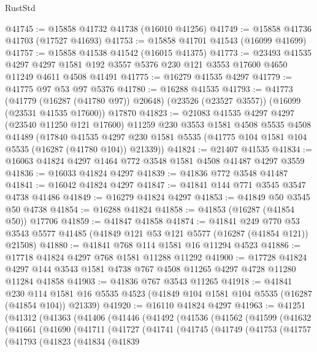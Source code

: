 \begin{lexlean}{RustStd}
\begin{coremodule}
@41745 := @15858 @41732 @41738 (@16010 @41256)
@41749 := @15858 @41736 @41703 (@17527 @41693)
@41753 := @15858 @41701 @41543 (@16099 @41699)
@41757 := @15858 @41538 @41542 (@16015 @41375)
@41773 := @23493
    @41535
    @4297
    @4297
    @1581
    @192
    @3557
    @5376
    @230
    @121
    @3553
    @17600
    @4650
    @11249
    @4611
    @4508
    @41491
@41775 := @16279 @41535 @4297
@41779 := @41775 @97 @53 @97 @5376
@41780 := @16288 @41535
@41793 := @41773
    (@41779 (@16287 (@41780 @97)) @20648)
    (@23526 (@23527 @3557))
    (@16099 (@23531 @41535 @17600))
    @17870
@41823 := @21083
    @41535
    @4297
    @4297
    (@23540 @11250 @121 @17600)
    @11259
    @230
    @3553
    @1581
    @4508
    @5535
    @4508
    @41489
    (@17840
      @41535
      @4297
      @230
      @1581
      @5535
      (@41775 @104 @1581 @104 @5535 (@16287 (@41780 @104)) @21339))
@41824 := @21407 @41535
@41834 := @16063 @41824 @4297 @1464 @772 @3548 @1581 @4508 @41487 @4297 @3559
@41836 := @16033 @41824 @4297
@41839 := @41836 @772 @3548 @41487
@41841 := @16042 @41824 @4297
@41847 := @41841 @144 @771 @3545 @3547 @4738 @41486
@41849 := @16279 @41824 @4297
@41853 := @41849 @50 @3545 @50 @4738
@41854 := @16288 @41824
@41858 := @41853 (@16287 (@41854 @50)) @17706
@41859 := @41847 @41858
@41874 := @41841
    @249
    @770
    @53
    @3543
    @5577
    @41485
    (@41849 @121 @53 @121 @5577 (@16287 (@41854 @121)) @21508)
@41880 := @41841 @768 @114 @1581 @16 @11294 @4523
@41886 := @17718 @41824 @4297 @768 @1581 @11288 @11292
@41900 := @17728
    @41824
    @4297
    @144
    @3543
    @1581
    @4738
    @767
    @4508
    @11265
    @4297
    @4728
    @11280
    @11284
    @41858
@41903 := @41836 @767 @3543 @11265
@41918 := @41841
    @230
    @114
    @1581
    @16
    @5535
    @4523
    (@41849 @104 @1581 @104 @5535 (@16287 (@41854 @104)) @21339)
@41920 := @16110 @41824 @4297
@41963 := @41251
    (@41312
      (@41363
        (@41406
          (@41446
            (@41492
              (@41536
                (@41562
                  (@41599
                    (@41632
                      (@41661
                        (@41690
                          (@41711
                            (@41727
                              (@41741
                                (@41745
                                  (@41749
                                    (@41753
                                      (@41757
                                        (@41793
                                          (@41823
                                            (@41834
                                              (@41839

\end{coremodule}
\end{lexlean}

